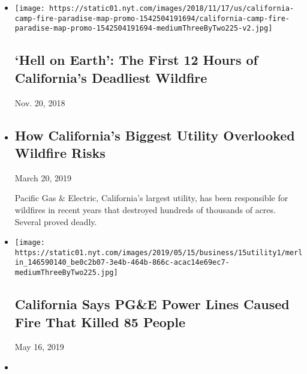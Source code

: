 \begin{itemize}
\item
  \href{https://www.nytimes.com/interactive/2018/11/18/us/california-camp-fire-paradise.html}{}

  \texttt{[image: https://static01.nyt.com/images/2018/11/17/us/california-camp-fire-paradise-map-promo-1542504191694/california-camp-fire-paradise-map-promo-1542504191694-mediumThreeByTwo225-v2.jpg]}

  \hypertarget{hell-on-earth-the-first-12-hours-of-californias-deadliest-wildfire}{%
  \subsection{`Hell on Earth': The First 12 Hours of California's
  Deadliest
  Wildfire}\label{hell-on-earth-the-first-12-hours-of-californias-deadliest-wildfire}}

  Nov. 20, 2018
\item
  \href{https://www.nytimes.com/interactive/2019/03/18/business/pge-california-wildfires.html}{}

  \hypertarget{how-californias-biggest-utility-overlooked-wildfire-risks}{%
  \subsection{How California's Biggest Utility Overlooked Wildfire
  Risks}\label{how-californias-biggest-utility-overlooked-wildfire-risks}}

  March 20, 2019

  Pacific Gas \& Electric, California's largest utility, has been
  responsible for wildfires in recent years that destroyed hundreds of
  thousands of acres. Several proved deadly.
\item
  \href{https://www.nytimes.com/2019/05/15/business/pge-fire.html}{}

  \texttt{[image: https://static01.nyt.com/images/2019/05/15/business/15utility1/merlin\_146590140\_be0c2b07-3e4b-464b-866c-acac14e69ec7-mediumThreeByTwo225.jpg]}

  \hypertarget{california-says-pge-power-lines-caused-fire-that-killed-85-people}{%
  \subsection{California Says PG\&E Power Lines Caused Fire That Killed
  85
  People}\label{california-says-pge-power-lines-caused-fire-that-killed-85-people}}

  May 16, 2019
\item
  \href{https://www.nytimes.com/2018/11/10/us/california-wildfires-paradise-malibu.html}{}


\end{itemize}
